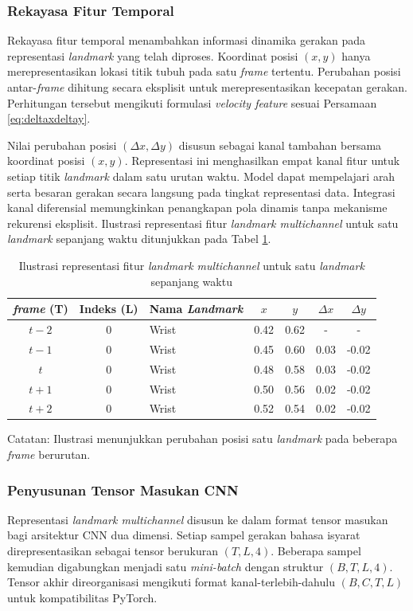 \subsubsection{Rekayasa Fitur Temporal}
\label{subsubsec:perhitungan-perubahan}
Rekayasa fitur temporal menambahkan informasi dinamika gerakan pada representasi \textit{landmark} yang telah diproses.
Koordinat posisi $(x,y)$ hanya merepresentasikan lokasi titik tubuh pada satu \textit{frame} tertentu.
Perubahan posisi antar-\textit{frame} dihitung secara eksplisit untuk merepresentasikan kecepatan gerakan.
Perhitungan tersebut mengikuti formulasi \textit{velocity feature} sesuai Persamaan \ref{eq:deltaxdeltay}.

Nilai perubahan posisi $(\Delta x, \Delta y)$ disusun sebagai kanal tambahan bersama koordinat posisi $(x,y)$.
Representasi ini menghasilkan empat kanal fitur untuk setiap titik \textit{landmark} dalam satu urutan waktu.
Model dapat mempelajari arah serta besaran gerakan secara langsung pada tingkat representasi data.
Integrasi kanal diferensial memungkinkan penangkapan pola dinamis tanpa mekanisme rekurensi eksplisit.
Ilustrasi representasi fitur \textit{landmark multichannel} untuk satu \textit{landmark} sepanjang waktu ditunjukkan pada Tabel \ref{tab:3-landmark-multichannel-example}.

\begin{table}[H]
\centering
\caption{Ilustrasi representasi fitur \textit{landmark multichannel} untuk satu \textit{landmark} sepanjang waktu}
\label{tab:3-landmark-multichannel-example}
\begin{tabular}{|c|c|l|c|c|c|c|}
\hline
\textbf{\textit{frame} (T)} & \textbf{Indeks (L)} & \textbf{Nama \textit{Landmark}} & $x$ & $y$ & $\Delta x$ & $\Delta y$ \\ \hline
$t-2$ & 0 & Wrist & 0.42 & 0.62 & -    & -    \\ \hline
$t-1$ & 0 & Wrist & 0.45 & 0.60 & 0.03  & -0.02 \\ \hline
$t$   & 0 & Wrist & 0.48 & 0.58 & 0.03  & -0.02 \\ \hline
$t+1$ & 0 & Wrist & 0.50 & 0.56 & 0.02  & -0.02 \\ \hline
$t+2$ & 0 & Wrist & 0.52 & 0.54 & 0.02  & -0.02 \\ \hline
\end{tabular}
{\footnotesize Catatan: Ilustrasi menunjukkan perubahan posisi satu \textit{landmark} pada beberapa \textit{frame} berurutan.}
\end{table}

\subsubsection{Penyusunan Tensor Masukan CNN}
\label{subsubsec:penyusunan-tensor}
Representasi \textit{landmark multichannel} disusun ke dalam format tensor masukan bagi arsitektur CNN dua dimensi.
Setiap sampel gerakan bahasa isyarat direpresentasikan sebagai tensor berukuran $(T, L, 4)$.
Beberapa sampel kemudian digabungkan menjadi satu \textit{mini-batch} dengan struktur $(B, T, L, 4)$.
Tensor akhir direorganisasi mengikuti format kanal-terlebih-dahulu $(B, C, T, L)$ untuk kompatibilitas PyTorch.

